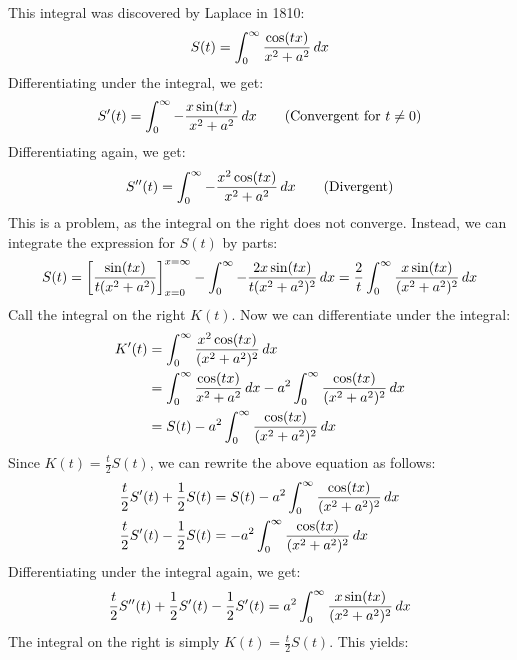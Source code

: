 \documentclass[main.tex]{subfiles}
\begin{document}
\begin{example}
    This integral was discovered by Laplace in 1810:
    \begin{equation*}
        S(t) = \int_0^\infty \frac{\cos(tx)}{x^2+a^2}\,dx
    \end{equation*}
    Differentiating under the integral, we get:
    \begin{equation*}
        S'(t) = \int_0^\infty -\frac{x\sin(tx)}{x^2+a^2}\,dx \tag{Convergent for $t\ne 0$}
    \end{equation*}
    Differentiating again, we get:
    \begin{equation*}
        S''(t) = \int_0^\infty -\frac{x^2\cos(tx)}{x^2+a^2}\,dx \tag{Divergent}
    \end{equation*}
    This is a problem, as the integral on the right does not converge. Instead, we can integrate the expression for $S(t)$ by parts:
    \begin{align*}
        S(t)
        = \qty[\frac{\sin(tx)}{t(x^2+a^2)}]_{x=0}^{x=\infty}
        - \int_0^\infty -\frac{2x\sin(tx)}{t(x^2+a^2)^2}\,dx
        = \frac{2}{t}\int_0^\infty \frac{x\sin(tx)}{(x^2+a^2)^2}\,dx
    \end{align*}
    Call the integral on the right $K(t)$. Now we can differentiate under the integral:
    \begin{align*}
        K'(t)
        &= \int_0^\infty \frac{x^2\cos(tx)}{(x^2+a^2)^2}\,dx \\
        &= \int_0^\infty \frac{\cos(tx)}{x^2+a^2}\,dx - a^2\int_0^\infty \frac{\cos(tx)}{(x^2+a^2)^2}\,dx \\
        &= S(t) - a^2\int_0^\infty \frac{\cos(tx)}{(x^2+a^2)^2}\,dx
    \end{align*}
    Since $K(t)=\frac{t}{2}S(t)$, we can rewrite the above equation as follows:
    \begin{align*}
        \frac{t}{2}S'(t) + \frac{1}{2}S(t)
        &= S(t) - a^2\int_0^\infty \frac{\cos(tx)}{(x^2+a^2)^2}\,dx \\
        \frac{t}{2}S'(t) - \frac{1}{2}S(t)
        &= -a^2\int_0^\infty \frac{\cos(tx)}{(x^2+a^2)^2}\,dx
    \end{align*}
    Differentiating under the integral again, we get:
    \begin{equation*}
        \frac{t}{2}S''(t) + \frac{1}{2}S'(t) - \frac{1}{2}S'(t)
        = a^2\int_0^\infty \frac{x\sin(tx)}{(x^2+a^2)^2}\,dx
    \end{equation*}
    The integral on the right is simply $K(t)=\frac{t}{2}S(t)$. This yields:

\end{example}
\end{document}
